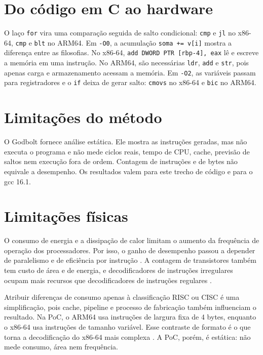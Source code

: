 \section{Do código em C ao hardware}
O laço \texttt{for} vira uma comparação seguida de salto condicional: \texttt{cmp} e \texttt{jl} no x86-64, \texttt{cmp} e \texttt{blt} no ARM64. Em \texttt{-O0}, a acumulação \texttt{soma += v[i]} mostra a diferença entre as filosofias. No x86-64, \texttt{add DWORD PTR [rbp-4], eax} lê e escreve a memória em uma instrução. No ARM64, são necessárias \texttt{ldr}, \texttt{add} e \texttt{str}, pois apenas carga e armazenamento acessam a memória. Em \texttt{-O2}, as variáveis passam para registradores e o \texttt{if} deixa de gerar salto: \texttt{cmovs} no x86-64 e \texttt{bic} no ARM64.

\section{Limitações do método}
O Godbolt fornece análise estática. Ele mostra as instruções geradas, mas não executa o programa e não mede ciclos reais, tempo de CPU, cache, previsão de saltos nem execução fora de ordem. Contagem de instruções e de bytes não equivale a desempenho. Os resultados valem para este trecho de código e para o gcc 16.1.

\section{Limitações físicas}
O consumo de energia e a dissipação de calor limitam o aumento da frequência de operação dos processadores. Por isso, o ganho de desempenho passou a depender de paralelismo e de eficiência por instrução \cite[p.~24--28]{patterson2017}. A contagem de transistores também tem custo de área e de energia, e decodificadores de instruções irregulares ocupam mais recursos que decodificadores de instruções regulares \cite[p.~408--410, 560--562]{stallings2017}.

Atribuir diferenças de consumo apenas à classificação RISC ou CISC é uma simplificação, pois cache, pipeline e processo de fabricação também influenciam o resultado. Na PoC, o ARM64 usa instruções de largura fixa de 4 bytes, enquanto o x86-64 usa instruções de tamanho variável. Esse contraste de formato é o que torna a decodificação do x86-64 mais complexa \cite[p.~289--292]{tanenbaum2013}. A PoC, porém, é estática: não mede consumo, área nem frequência.

